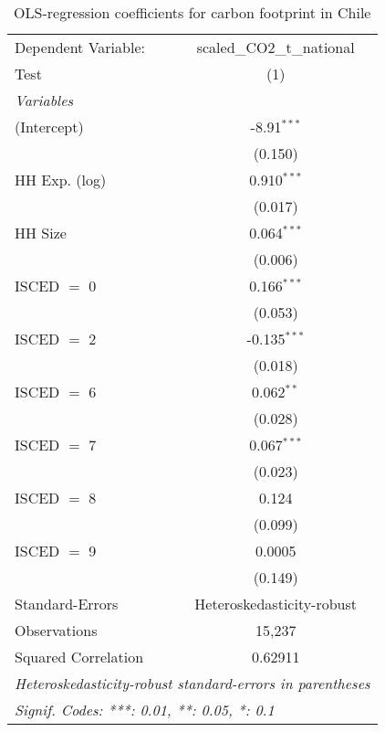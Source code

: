 
\begin{table}[htbp!]
   \centering
   \small
   \begin{adjustbox}{width = 1\textwidth, max height = 0.95\textheight, center}
      \begin{threeparttable}[b]
         \caption{\label{tab:OLS_2_CHL} OLS-regression coefficients for carbon footprint in Chile}
         \begin{tabular}{lc}
            \tabularnewline \midrule \midrule
            Dependent Variable: & scaled\_CO2\_t\_national\\     
            Test                & (1)\\  
            \midrule
            \emph{Variables}\\
            (Intercept)         & -8.91$^{***}$\\   
                                & (0.150)\\   
            HH Exp. (log)       & 0.910$^{***}$\\   
                                & (0.017)\\   
            HH Size             & 0.064$^{***}$\\   
                                & (0.006)\\   
            ISCED $=$ 0         & 0.166$^{***}$\\   
                                & (0.053)\\   
            ISCED $=$ 2         & -0.135$^{***}$\\   
                                & (0.018)\\   
            ISCED $=$ 6         & 0.062$^{**}$\\   
                                & (0.028)\\   
            ISCED $=$ 7         & 0.067$^{***}$\\   
                                & (0.023)\\   
            ISCED $=$ 8         & 0.124\\   
                                & (0.099)\\   
            ISCED $=$ 9         & 0.0005\\   
                                & (0.149)\\   
            \midrule 
            Standard-Errors     & Heteroskedasticity-robust \\   
            Observations        & 15,237\\  
            Squared Correlation & 0.62911\\  
            \midrule \midrule
            \multicolumn{2}{l}{\emph{Heteroskedasticity-robust standard-errors in parentheses}}\\
            \multicolumn{2}{l}{\emph{Signif. Codes: ***: 0.01, **: 0.05, *: 0.1}}\\
         \end{tabular}
         

\end{threeparttable}
\end{adjustbox}
\end{table}
